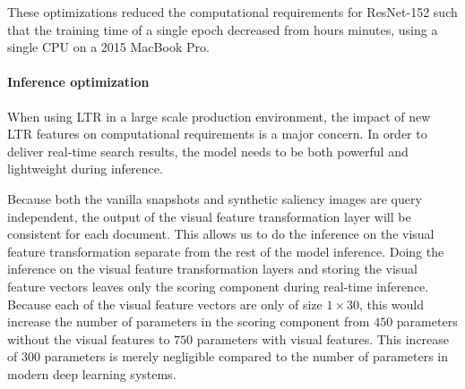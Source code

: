 These optimizations reduced the computational requirements for ResNet-152 such that the training time of a single epoch decreased from hours minutes, using a single CPU on a 2015 MacBook Pro. 

\paragraph{Inference optimization}
When using \ac{LTR} in a large scale production environment, the impact of new \ac{LTR} features on computational requirements is a major concern. 
In order to deliver real-time search results, the model needs to be both powerful and lightweight during inference. 

Because both the vanilla snapshots and synthetic saliency images are query independent, the output of the visual feature transformation layer will be consistent for each document. This allows us to do the inference on the visual feature transformation separate from the rest of the model inference. Doing the inference on the visual feature transformation layers and storing the visual feature vectors leaves only the scoring component during real-time inference. Because each of the visual feature vectors are only of size $1\times30$, this would increase the number of parameters in the scoring component from $450$ parameters without the visual features to $750$ parameters with visual features. This increase of $300$ parameters is merely negligible compared to the number of parameters in modern deep learning systems. 




